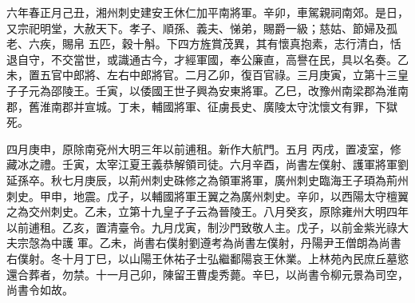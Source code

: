 \begin{pinyinscope}
 六年春正月己丑，湘州刺史建安王休仁加平南將軍。辛卯，車駕親祠南郊。是日，又宗祀明堂，大赦天下。孝子、順孫、義夫、悌弟，賜爵一級；慈姑、節婦及孤老、六疾，賜帛
 五匹，穀十斛。下四方旌賞茂異，其有懷真抱素，志行清白，恬退自守，不交當世，或識通古今，才經軍國，奉公廉直，高譽在民，具以名奏。乙未，置五官中郎將、左右中郎將官。二月乙卯，復百官祿。三月庚寅，立第十三皇子子元為邵陵王。壬寅，以倭國王世子興為安東將軍。乙巳，改豫州南梁郡為淮南郡，舊淮南郡并宣城。丁未，輔國將軍、征虜長史、廣陵太守沈懷文有罪，下獄死。



 四月庚申，原除南兗州大明三年以前逋租。新作大航門。五月
 丙戌，置凌室，修藏冰之禮。壬寅，太宰江夏王義恭解領司徒。六月辛酉，尚書左僕射、護軍將軍劉延孫卒。秋七月庚辰，以荊州刺史硃修之為領軍將軍，廣州刺史臨海王子頊為荊州刺史。甲申，地震。戊子，以輔國將軍王翼之為廣州刺史。辛卯，以西陽太守檀翼之為交州刺史。乙未，立第十九皇子子云為晉陵王。八月癸亥，原除雍州大明四年以前逋租。乙亥，置清臺令。九月戊寅，制沙門致敬人主。戊子，以前金紫光祿大夫宗愨為中護
 軍。乙未，尚書右僕射劉遵考為尚書左僕射，丹陽尹王僧朗為尚書右僕射。冬十月丁巳，以山陽王休祐子士弘繼鄱陽哀王休業。上林苑內民庶丘墓慾還合葬者，勿禁。十一月己卯，陳留王曹虔秀薨。辛巳，以尚書令柳元景為司空，尚書令如故。



\end{pinyinscope}
